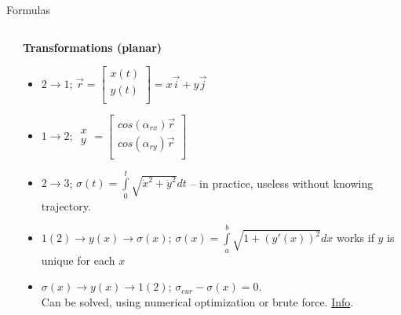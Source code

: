 \documentclass[aspectratio=169,xcolor=table,10pt, notes=hide]{beamer}
\begin{document}
\begin{frame}[t]{Formulas}
\begin{columns}[T,onlytextwidth]
\begin{column}{0.42\textwidth}
        \end{column}
        \begin{column}{0.60\textwidth}
            \textbf{Transformations (planar)}
            \vspace{-0.3cm}
            \begin{multicols}{2}
                \begin{itemize}
                    \footnotesize
                    \item $2 \rightarrow 1$; $\vec{r} = \begin{bmatrix}x(t)\\y(t)\\\end{bmatrix} = x\vec{i} + y\vec{j}$
                    \item $1 \rightarrow 2$; $\begin{matrix} x\\ y\end{matrix} = \begin{bmatrix}
                                  cos(\alpha_{rx})\vec{r} \\
                                  cos(\alpha_{ry})\vec{r} \\\end{bmatrix}$
                \end{itemize}
            \end{multicols}
            \vspace{-0.3cm}
            \begin{itemize}
                \footnotesize
                \item $2 \rightarrow 3$; $\sigma(t)=\int \limits _{0}^{t}{\sqrt {\dot{x}^2 + \dot{y}^2}}dt$ -- in practice, useless without knowing trajectory.
                \item $1(2) \rightarrow y(x) \rightarrow \sigma(x)$; $\sigma(x)=\int \limits _{a}^{b}{\sqrt {1+(y'(x))^{2}}}dx$ works if $y$ is unique for each $x$
                \item $\sigma(x) \rightarrow y(x) \rightarrow 1(2)$; $\sigma_{cur} - \sigma(x) =0$.\\ Can be solved, using numerical optimization or brute force. \href{https://en.wikipedia.org/wiki/Differentiable\_curve\#Length\_and\_natural\_parametrization}{Info}.
            \end{itemize}
        \end{column}
    \end{columns}
\end{frame}
\end{document}

